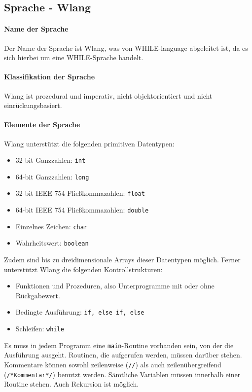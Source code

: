 \documentclass[parskip=full]{scrartcl}
\begin{document}
\subsection{Sprache - Wlang}
\paragraph{Name der Sprache}
Der Name der Sprache ist Wlang, was von WHILE-language abgeleitet ist, da es sich hierbei um eine WHILE-Sprache handelt.
\paragraph{Klassifikation der Sprache} Wlang ist prozedural und imperativ, nicht objektorientiert und nicht einrückungsbasiert.
\paragraph{Elemente der Sprache}
Wlang unterstützt die folgenden primitiven Datentypen:
\begin{itemize}
\item  32-bit Ganzzahlen: \texttt{int}
  \item  64-bit Ganzzahlen: \texttt{long}
 \item  32-bit IEEE 754 Fließkommazahlen: \texttt{float}
 \item   64-bit IEEE 754 Fließkommazahlen: \texttt{double}
  \item  Einzelnes Zeichen: \texttt{char}
  \item  Wahrheitswert: \texttt{boolean}
\end{itemize}
Zudem sind bis zu dreidimensionale Arrays dieser Datentypen möglich.
Ferner unterstützt Wlang die folgenden Kontrollstrukturen:
\begin{itemize}
\item Funktionen und Prozeduren, also Unterprogramme mit oder ohne Rückgabewert.
\item Bedingte Ausführung: \texttt{if, else if, else}
\item Schleifen: \texttt{while}
\end{itemize}
Es muss in jedem Programm eine \texttt{main}-Routine vorhanden sein, von der die Ausführung ausgeht. Routinen, die aufgerufen werden, müssen darüber stehen. Kommentare können sowohl zeilenweise (\texttt{//}) als auch zeilenübergreifend (\texttt{/*Kommentar*/}) benutzt werden. Sämtliche Variablen müssen innerhalb einer Routine stehen. Auch Rekursion ist möglich.
\newpage
\end{document}
